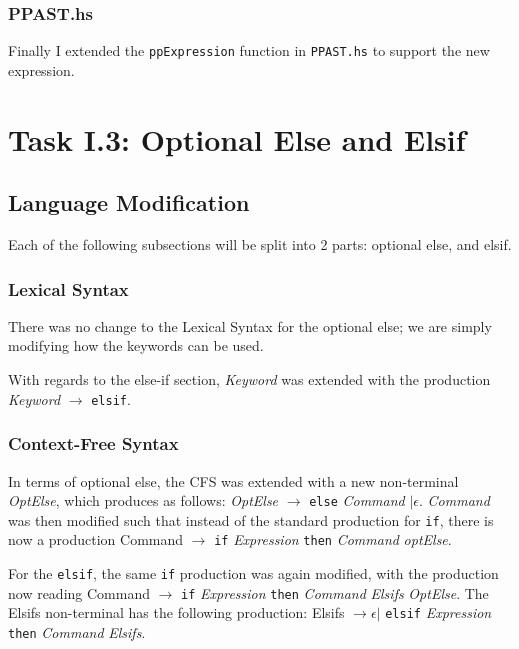\documentclass[12pt]{article}
\newcommand{\lstin}[3]{
  
}
\begin{document}
\lstin{185}{189}{Parser.y}

\subsubsection{PPAST.hs}
Finally I extended the \verb|ppExpression| function in \verb|PPAST.hs| to support the new expression.

\lstin{96}{100}{PPAST.hs}

\section{Task I.3: Optional Else and Elsif}
\subsection{Language Modification}
Each of the following subsections will be split into 2 parts: optional else, and elsif.
\subsubsection{Lexical Syntax}
There was no change to the Lexical Syntax for the optional else; we are simply modifying how the keywords can be used.\\\par

With regards to the else-if section, \textit{Keyword} was extended with the production \textit{Keyword} $\rightarrow$ \verb|elsif|.

\subsubsection{Context-Free Syntax}
In terms of optional else, the CFS was extended with a new non-terminal \textit{OptElse}, which produces as follows: \textit{OptElse} $\rightarrow$ \verb|else| \textit{Command} $|   \epsilon$.
\textit{Command} was then modified such that instead of the standard production for \verb|if|, there is now a production Command $\rightarrow$ \verb|if| \textit{Expression} \verb|then| \textit{Command} \textit{optElse}.
\\\par

For the \verb|elsif|, the same \verb|if| production was again modified, with the production now reading Command $\rightarrow$ \verb|if| \textit{Expression} \verb|then| \textit{Command} \textit{Elsifs} \textit{OptElse}.
The Elsifs non-terminal has the following production: Elsifs $\rightarrow \epsilon |$ \verb|elsif| \textit{Expression} \verb|then| \textit{Command} \textit{Elsifs}.
\end{document}
